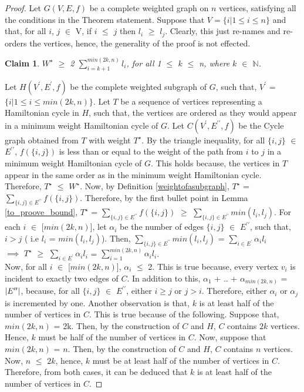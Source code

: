 \documentclass{article}
\newtheorem{claim}{Claim}
\begin{document}
\begin{proof}
Let $G(V,E,f)$ be a complete weighted graph on $n$ vertices, satisfying all the conditions in the Theorem statement. Suppose that $V=\{i | 1 \leq i \leq n\}$ and that, for all $i$, $j$ $\in$ V, if $i$ $\leq$ $j$ then $l_i$ $\geq$ $l_j$. Clearly, this just re-names and re-orders the vertices, hence, the generality of the proof is not effected.
\begin{claim}
\label{claim1}
$W^\star$ $\geq$ 2 $\sum_{i = k+1}^{min(2k, n)} l_i$, for all 1 $\leq$ $k$ $\leq$ n, where $k$ $\in$ $\mathbb{N}$.
\end{claim}
Let $H(V^\prime,E^\prime,f)$ be the complete weighted subgraph of $G$, such that, $V^\prime$ = $\{i | 1 \leq i \leq min(2k, n)\}$. Let $T$ be a sequence of vertices representing a Hamiltonian cycle in $H$, such that, the vertices are ordered as they would appear in a minimum weight Hamiltonian cycle of $G$. Let $C(V^\prime, E^{\prime\prime}, f)$ be the Cycle graph obtained from $T$ with weight $T^\star$. By the triangle inequality, for all $\{i, j\}$ $\in$ $E^{\prime\prime}$, $f(\{i, j\})$ is less than or equal to the weight of the path from $i$ to $j$ in a minimum weight Hamiltonian cycle of $G$. This holds because, the vertices in $T$ appear in the same order as in the minimum weight Hamiltonian cycle. Therefore, $T^\star$ $\leq$ $W^\star$. Now, by Definition \ref{weightofasubgraph}, $T^\star$ =  $\sum_{\{i, j\} \in E^{\prime\prime}} f(\{i, j\})$. Therefore, by the first bullet point in Lemma \ref{to_proove_bound},  $T^\star$ = $\sum_{\{i, j\} \in E^{\prime\prime}} f(\{i, j\})$ $\geq$  $\sum_{\{i, j\} \in E^{\prime\prime}} min(l_i, l_j)$. For each $i$ $\in$ [$min(2k, n)$], let $\alpha_i$ be the number of edges $\{i, j\}$ $\in$ $E^{\prime\prime}$, such that, $i > j$ ( i.e $l_i$ = $min(l_i, l_j)$). Then, $\sum_{\{i, j\} \in E^{\prime\prime}} min(l_i, l_j)$ = $\sum_{i \in E^\prime} \alpha_il_i$\\
$\implies$ $T^\star$ $\geq$ $\sum_{i \in E^\prime} \alpha_i l_i$ = $\sum_{i =1}^{min(2k, n)} \alpha_i l_i$.\\ Now, for all $i$ $\in$ [$min(2k, n)$], $\alpha_i$ $\leq$ 2. This is true because, every vertex $v_i$ is incident to exactly two edges of $C$. In addition to this, $\alpha_1$ + .. + $\alpha_{min(2k, n)}$ = $\abs{E^{\prime\prime}}$, because, for all $\{i,j\}$ $\in$ $E^{\prime\prime}$, either $ i \geq j$ or $j > i$. Therefore, either $\alpha_i$ or $\alpha_j$ is incremented by one. Another observation is that, $k$ is at least half of the number of vertices in $C$. This is true because of the following. Suppose that, $min(2k, n)$ = 2k. Then, by the construction of $C$ and $H$, $C$ contains $2k$ vertices. Hence, $k$ must be half of the number of vertices in $C$. Now, suppose that $min(2k, n)$ = $n$. Then, by the construction of $C$ and $H$, $C$ contains $n$ vertices. Now, $n$ $\leq$ $2k$, hence, $k$ must be at least half of the number of vertices in $C$. Therefore, from both cases, it can be deduced that $k$ is at least half of the number of vertices in $C$.

\end{proof}
\end{document}
